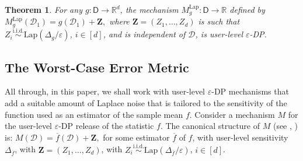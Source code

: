 \documentclass[conference,letterpaper]{IEEEtran}
\newtheorem{theorem}{Theorem}[section]
\theoremstyle{remark}
\theoremstyle{definition}
\begin{document}
\begin{theorem}
	\label{thm:dp}
	For any $g: \mathsf{D}\to \mathbb{R}^d$, the mechanism $M^{\text{Lap}}_g: \mathsf{D}\to \mathbb{R}$ defined by
	$
	M^{\text{Lap}}_g(\mathcal{D}_1) = g(\mathcal{D}_1)+\mathbf{Z},
	$
	where $\mathbf{Z} = (Z_1,\ldots,Z_d)$ is such that $Z_i\stackrel{\text{i.i.d.}}{\sim} \text{Lap}(\Delta_g/\varepsilon)$, $i\in [d]$, and is independent of $\mathcal{D}$, is user-level $\varepsilon$-DP.
\end{theorem}

\subsection{The Worst-Case Error Metric}

All through, in this paper, we shall work with user-level $\varepsilon$-DP mechanisms that add a suitable amount of Laplace noise that is tailored to the sensitivity of the function used as an estimator of the sample mean $f$. %
Consider a mechanism $M$ for the user-level $\varepsilon$-DP release of the statistic $f$. The canonical structure of $M$ (see \cite[Footnote 1]{staircase}, \cite{opt}) is: $M(\mathcal{D}) = \overline{f}(\mathcal{D})+{\mathbf{Z}},$
for some estimator $\overline{f}$ of $f$, with user-level sensitivity $\Delta_{\overline{f}}$, with $\mathbf{Z} = (Z_1,\ldots,Z_d)$, with $Z_i\stackrel{\text{i.i.d.}}{\sim} \text{Lap}\left(\Delta_{\overline{f}}/\varepsilon\right)$, $i\in [d]$.  


\end{document}

